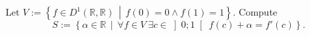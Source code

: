 \begin{problem}
    Let \( V := \left\{ f \in D^1\left(\mathbb{R},\mathbb{R}\right) \,\middle|\, f\left(0\right) = 0 \wedge f\left(1\right) = 1 \right\} \). Compute
    \[
        S := \left\{ \alpha \in \mathbb{R} \,\middle|\, \forall f \in V \ \exists c \in \left]0;1\right[ \ f\left(c\right)+\alpha = f'\left(c\right) \right\}.
    \]
\end{problem}
